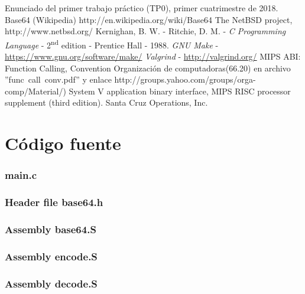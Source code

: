 \documentclass[11pt,a4paper]{article}
\begin{document}
\begin{thebibliography}{10}
	\bibitem{}Enunciado del primer trabajo práctico (TP0), primer cuatrimestre de 2018.
	\bibitem{}Base64 (Wikipedia) http://en.wikipedia.org/wiki/Base64
	\bibitem{}The NetBSD project, http://www.netbsd.org/
	 Kernighan, B. W. - Ritchie, D. M. - \emph{C Programming Language} - 2\textsuperscript{nd} edition - Prentice Hall - 1988.
	 \emph{GNU Make} - \hyperlink{make}{https://www.gnu.org/software/make/}
	 \emph{Valgrind} - \hyperlink{valgrind}{http://valgrind.org/}
	\bibitem{}MIPS ABI: Function Calling, Convention Organización de computadoras(66.20) en archivo ''func\ call\ conv.pdf'' y enlace http://groups.yahoo.com/groups/orga-comp/Material/)
	\bibitem{}System V application binary interface, MIPS RISC processor supplement
(third edition). Santa Cruz Operations, Inc.
\end{thebibliography}
\newpage
\appendix
\section{Código fuente}\label{appendix_codigo_fuente}

\subsubsection{main.c}\label{main}


\newpage

\subsubsection{Header file base64.h}\label{base64.h}


\newpage

\subsubsection{Assembly base64.S}\label{base64.S}


\newpage

\subsubsection{Assembly encode.S}\label{encode.S}


\newpage

\subsubsection{Assembly decode.S}\label{decode.S}

\end{document}

